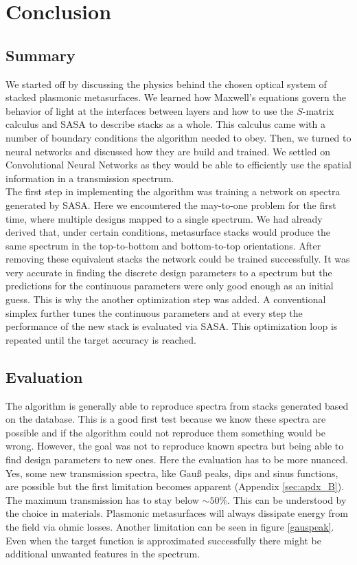 \section{Conclusion} \label{sec:conclusion}

\subsection{Summary}
We started off by discussing the physics behind the chosen optical system of stacked plasmonic metasurfaces. 
We learned how Maxwell's equations govern the behavior of light at the interfaces between layers and how to use the $S$-matrix calculus and SASA to describe stacks as a whole. This calculus came with a number of boundary conditions the algorithm needed to obey. Then, we turned to neural networks and discussed how they are build and trained. We settled on Convolutional Neural Networks as they would be able to efficiently use the spatial information in a transmission spectrum.
\\

\indent
The first step in implementing the algorithm was training a network on spectra generated by SASA. Here we encountered the may-to-one problem for the first time, where multiple designs mapped to a single spectrum. We had already derived that, under certain conditions, metasurface stacks would produce the same spectrum in the top-to-bottom and bottom-to-top orientations. After removing these equivalent stacks the network could be trained successfully. It was very accurate in finding the discrete design parameters to a spectrum but the predictions for the continuous parameters were only good enough as an initial guess.
This is why the another optimization step was added. A conventional simplex further tunes the continuous parameters and at every step the performance of the new stack is evaluated via SASA. This optimization loop is repeated until the target accuracy is reached.


\subsection{Evaluation} \label{sec:eval}
The algorithm is generally able to reproduce spectra from stacks generated based on the database. 
This is a good first test because we know these spectra are possible and if the algorithm could not reproduce them something would be wrong. However, the goal was not to reproduce known spectra but being able to find design parameters to new ones. Here the evaluation has to be more nuanced. Yes, some new transmission spectra, like Gauß peaks, dips and sinus functions, are possible but the first limitation becomes apparent (Appendix \ref{sec:apdx_B}).
The maximum transmission has to stay below $\sim 50\%$. This can be understood by the choice in materials. Plasmonic metasurfaces will always dissipate energy from the field via ohmic losses. Another limitation can be seen in figure \ref{gauspeak}. Even when the target function is approximated successfully there might be additional unwanted features in the spectrum. 
\\

